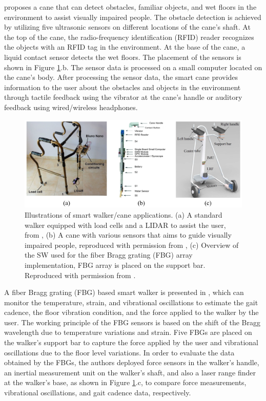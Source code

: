 \textcite{meshram_astute_2019} proposes a cane that can detect obstacles, familiar objects, and wet floors in the environment to assist visually impaired people. The obstacle detection is achieved by utilizing five ultrasonic sensors on different locations of the cane's shaft. At the top of the cane, the radio-frequency identification (RFID) reader recognizes the objects with an RFID tag in the environment.
At the base of the cane, a liquid contact sensor detects the wet floors. The placement of the sensors is shown in Figure \ref{fig:smart_cane}.b. The sensor data is processed on a small computer located on the cane's body. After processing the sensor data, the smart cane provides information to the user about the obstacles and objects in the environment through tactile feedback using the vibrator at the cane's handle or auditory feedback using wired/wireless headphones. 

\begin{figure}[h!]
    \centering
    \includegraphics[scale=0.95]{Figure/Seating and Mobility Aids/Smart_cane.PNG}
    \caption{Illustrations of smart walker/cane applications. (a) A standard walker equipped with load cells and a LIDAR to assist the user, from \parencite{viegas_monitoring_2018}, (b)  A cane with various sensors that aims to guide visually impaired people, reproduced with permission from \parencite{meshram_astute_2019}, (c) Overview of the SW used for the fiber Bragg grating (FBG) array implementation, FBG array is placed on the support bar. Reproduced with permission from \parencite{leal-junior_plane-by-plane_2019}.}
    \label{fig:smart_cane}
\end{figure}

A fiber Bragg grating (FBG) based smart walker is presented in \textcite{leal-junior_plane-by-plane_2019}, which can monitor the temperature, strain, and vibrational oscillations to estimate the gait cadence, the floor vibration condition, and the force applied to the walker by the user. The working principle of the FBG sensors is based on the shift of the Bragg wavelength due to temperature variations and strain. Five FBGs are placed on the walker's support bar to capture the force applied by the user and vibrational oscillations due to the floor level variations. In order to evaluate the data obtained by the FBGs, the authors deployed force sensors in the walker's handle, an inertial measurement unit on the walker's shaft, and also a laser range finder at the walker's base, as shown in Figure \ref{fig:smart_cane}.c, to compare force measurements, vibrational oscillations, and gait cadence data, respectively.

